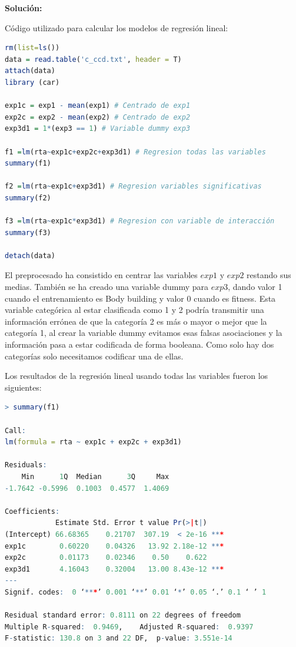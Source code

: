 \documentclass[a4paper]{article}
\begin{document}
\textbf{Solución:}\par
Código utilizado para calcular los modelos de regresión lineal:\par
\begin{lstlisting}[language=R]
rm(list=ls())
data = read.table('c_ccd.txt', header = T)
attach(data)
library (car)

exp1c = exp1 - mean(exp1) # Centrado de exp1
exp2c = exp2 - mean(exp2) # Centrado de exp2
exp3d1 = 1*(exp3 == 1) # Variable dummy exp3

f1 =lm(rta~exp1c+exp2c+exp3d1) # Regresion todas las variables
summary(f1)

f2 =lm(rta~exp1c+exp3d1) # Regresion variables significativas
summary(f2)

f3 =lm(rta~exp1c*exp3d1) # Regresion con variable de interacción
summary(f3)

detach(data)
\end{lstlisting}
El preprocesado ha consistido en centrar las variables $exp1$ y $exp2$ restando sus medias. También se ha creado una variable dummy para $exp3$, dando valor 1 cuando el entrenamiento es Body building y valor 0 cuando es fitness. Esta variable categórica al estar clasificada como 1 y 2 podría transmitir una información errónea de que la categoría 2 es más o mayor o mejor que la categoría 1, al crear la variable dummy evitamos esas falsas asociaciones y la información pasa a estar codificada de forma booleana. Como solo hay dos categorías solo necesitamos codificar una de ellas. \par
Los resultados de la regresión lineal usando todas las variables fueron los siguientes: \par
\begin{lstlisting}[language=R]
> summary(f1)

Call:
lm(formula = rta ~ exp1c + exp2c + exp3d1)

Residuals:
    Min      1Q  Median      3Q     Max 
-1.7642 -0.5996  0.1003  0.4577  1.4069 

Coefficients:
            Estimate Std. Error t value Pr(>|t|)    
(Intercept) 66.68365    0.21707  307.19  < 2e-16 ***
exp1c        0.60220    0.04326   13.92 2.18e-12 ***
exp2c        0.01173    0.02346    0.50    0.622    
exp3d1       4.16043    0.32004   13.00 8.43e-12 ***
---
Signif. codes:  0 ‘***’ 0.001 ‘**’ 0.01 ‘*’ 0.05 ‘.’ 0.1 ‘ ’ 1

Residual standard error: 0.8111 on 22 degrees of freedom
Multiple R-squared:  0.9469,	Adjusted R-squared:  0.9397 
F-statistic: 130.8 on 3 and 22 DF,  p-value: 3.551e-14
\end{lstlisting}
\end{document}
